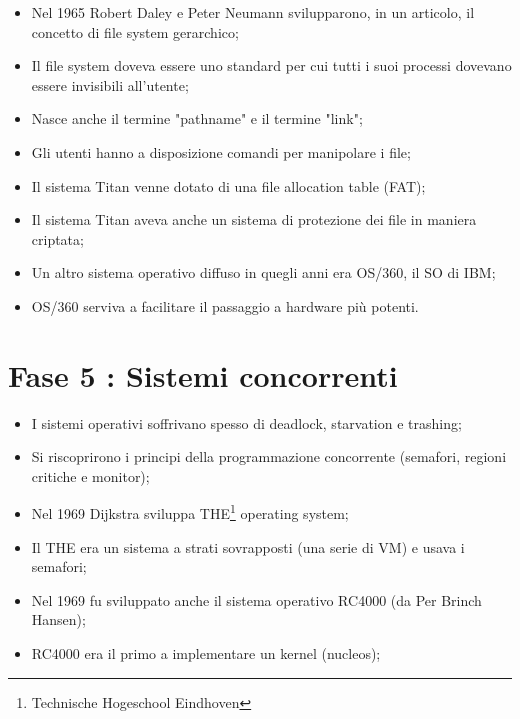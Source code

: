 \begin{itemize}
    \item Nel 1965 Robert Daley e Peter Neumann svilupparono, in un 
    articolo, il concetto di file system gerarchico;
    \item Il file system doveva essere uno standard per cui tutti i suoi 
    processi dovevano essere invisibili all'utente;
    \item Nasce anche il termine "pathname" e il termine "link";
    \item Gli utenti hanno a disposizione comandi per manipolare i file;
    \item Il sistema Titan venne dotato di una file allocation table (FAT);
    \item Il sistema Titan aveva anche un sistema di protezione dei file in maniera criptata;
    \item Un altro sistema operativo diffuso in quegli anni era OS/360,
    il SO di IBM;
    \item OS/360 serviva a facilitare il passaggio a hardware più potenti.
\end{itemize}



\section{Fase 5 : Sistemi concorrenti}

\begin{itemize}
    \item I sistemi operativi soffrivano spesso di deadlock, starvation e trashing;
    \item Si riscoprirono i principi della programmazione concorrente (semafori, regioni critiche e monitor);
    \item Nel 1969 Dijkstra sviluppa THE\footnote{Technische Hogeschool Eindhoven} operating system;
    \item Il THE era un sistema a strati sovrapposti (una serie di VM) e usava i semafori;
    \item Nel 1969 fu sviluppato anche il sistema operativo RC4000 (da Per Brinch Hansen);
    \item RC4000 era il primo a implementare un kernel (nucleos);
\end{itemize}

